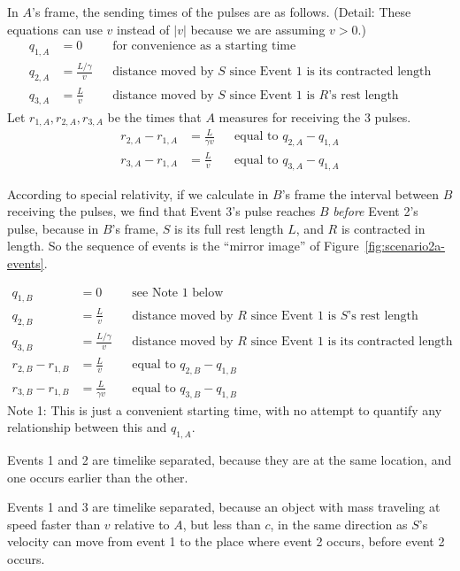 \documentclass[a4paper]{article}
\theoremstyle{plain}
\theoremstyle{definition}
\begin{document}
In $A$'s frame, the sending times of the pulses are as follows.
(Detail: These equations can use $v$ instead of $|v|$ because
we are assuming $v > 0$.)
\begin{align*}
q_{1,A} & = 0 & & \text{for convenience as a starting time} \\
q_{2,A} & = \frac{L/\gamma}{v} & & \text{distance moved by $S$ since Event 1 is its contracted length} \\
q_{3,A} & = \frac{L}{v} & & \text{distance moved by $S$ since Event 1 is $R$'s rest length}
\end{align*}
Let $r_{1,A}, r_{2,A}, r_{3,A}$ be the times that $A$ measures for
receiving the 3 pulses.
\begin{align*}
r_{2,A} - r_{1,A} & = \frac{L}{\gamma v} & & \text{equal to $q_{2,A} - q_{1,A}$} \\
r_{3,A} - r_{1,A} & = \frac{L}{v} & & \text{equal to $q_{3,A} - q_{1,A}$}
\end{align*}

According to special relativity, if we calculate in $B$'s frame the
interval between $B$ receiving the pulses, we find that Event 3's
pulse reaches $B$ {\em before} Event 2's pulse, because in $B$'s frame, $S$
is its full rest length $L$, and $R$ is contracted in length.  So the
sequence of events is the ``mirror image'' of
Figure~\ref{fig:scenario2a-events}.

\begin{align*}
q_{1,B} & = 0 & & \text{see Note 1 below}\\
q_{2,B} & = \frac{L}{v} & & \text{distance moved by $R$ since Event 1 is $S$'s rest length} \\
q_{3,B} & = \frac{L/\gamma}{v} & & \text{distance moved by $R$ since Event 1 is its contracted length} \\
r_{2,B} - r_{1,B} & = \frac{L}{v} & & \text{equal to $q_{2,B} - q_{1,B}$} \\
r_{3,B} - r_{1,B} & = \frac{L}{\gamma v} & & \text{equal to $q_{3,B} - q_{1,B}$}
\end{align*}
Note 1: This is just a convenient starting time, with no attempt to
quantify any relationship between this and $q_{1,A}$.

Events 1 and 2 are timelike separated, because they are at the same
location, and one occurs earlier than the other.

Events 1 and 3 are timelike separated, because an object with mass
traveling at speed faster than $v$ relative to $A$, but less than $c$,
in the same direction as $S$'s velocity can move from event 1 to the
place where event 2 occurs, before event 2 occurs.
\end{document}

